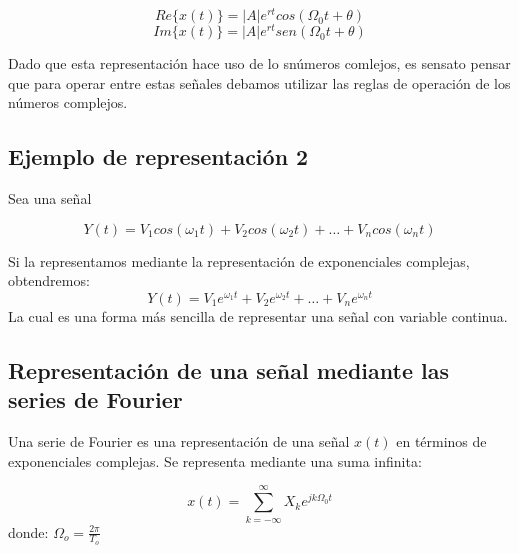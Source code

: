 \begin{equation}
    Re\{x(t)\} = |A|e^{rt}cos(\Omega_0 t +\theta)
    \label{Real}
\end{equation}
\begin{equation}
    Im\{x(t)\} = |A|e^{rt}sen(\Omega_0 t +\theta)
    \label{Ima}
\end{equation}


Dado que esta representación hace uso de lo snúmeros comlejos, es sensato pensar que para operar entre estas señales debamos utilizar las reglas de operación de los números complejos.

\subsection{Ejemplo de representación 2}
Sea una señal

$$Y(t) = V_1cos(\omega_1 t) + V_2cos(\omega_2 t) + \dots + V_ncos(\omega_n t)$$

Si la representamos mediante la representación de exponenciales complejas, obtendremos:
$$Y(t) =  V_1e^{\omega_1 t} + V_2e^{\omega_2 t} + \dots + V_ne^{\omega_n t}$$
La cual es una forma más sencilla de representar una señal con variable continua.

\subsection{Representación de una señal mediante las series de Fourier}

Una serie de Fourier es una representación de una señal $x(t)$ en términos de exponenciales complejas\cite{moya_procesamiento_nodate}. Se representa mediante una suma infinita:

\begin{equation}
    x(t) = \sum^{\infty}_{k = -\infty} X_k e^{jk\Omega_0 t}
    \label{FourierExp}
\end{equation}
donde:
$\Omega_o = \frac{2\pi}{T_o}$








